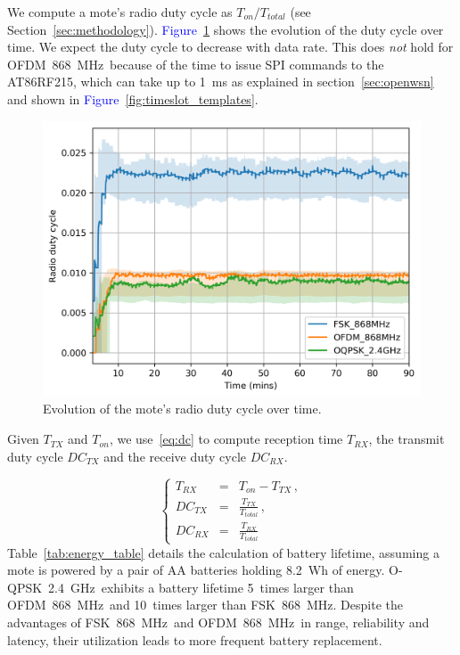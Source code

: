 \documentclass[sensors,article,submit,moreauthors,pdftex]{Definitions/mdpi}
\newcommand{\fsk}           {FSK~868~MHz}
\newcommand{\oqpsk}         {O-QPSK~2.4~GHz}
\newcommand{\ofdm}          {OFDM~868~MHz}
\newcommand{\figwidth}      {0.78}
\newcommand{\update}[1]     {\textcolor{blue}{#1}}
\begin{document}

We compute a mote's radio duty cycle as $T_{on}/T_{total}$ (see Section~\ref{sec:methodology}).
\update{Figure}~\ref{fig:dutyCycle_time} shows the evolution of the duty cycle over time.
We expect the duty cycle to decrease with data rate.
This does \textit{not} hold for \ofdm\ because of the time to issue SPI commands to the AT86RF215, which can take up to 1~ms as explained in section~\ref{sec:openwsn} and shown in \update{Figure}~\ref{fig:timeslot_templates}.

\begin{figure}[ht]
	\centering
	\includegraphics[width=\figwidth\columnwidth]{dutyCycle_time}
	\caption{
	    Evolution of the mote's radio duty cycle over time.
	}
    \label{fig:dutyCycle_time}
\end{figure}

Given $T_{TX}$ and $T_{on}$, we use~\eqref{eq:dc} to compute reception time $T_{RX}$, the transmit duty cycle $DC_{TX}$ and the receive duty cycle $DC_{RX}$.

\begin{equation}
    \left\{
        \begin{array}{lcl}
            T_{RX}  & = & T_{on}-T_{TX}             \,, \\
            DC_{TX} & = & \frac{T_{TX}}{T_{total}} \,, \\
            DC_{RX} & = & \frac{T_{RX}}{T_{total}}
        \end{array}
    \right.
    \label{eq:dc}
\end{equation}
Table~\ref{tab:energy_table} details the calculation of battery lifetime, assuming a mote is powered by a pair of AA batteries holding 8.2~Wh of energy.
\oqpsk\ exhibits a battery lifetime
      5~times larger than \ofdm\ and
     10~times larger than \fsk.
Despite the advantages of \fsk\ and \ofdm\ in range, reliability and latency, their utilization leads to more frequent battery replacement.
\end{document}
